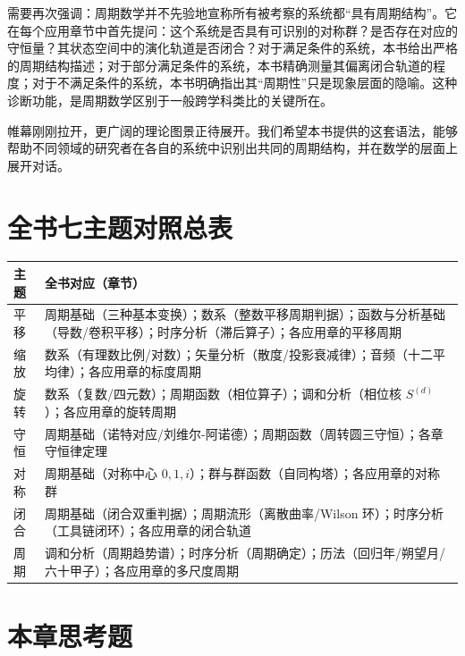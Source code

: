 需要再次强调：周期数学并不先验地宣称所有被考察的系统都“具有周期结构”。它在每个应用章节中首先提问：这个系统是否具有可识别的对称群？是否存在对应的守恒量？其状态空间中的演化轨道是否闭合？对于满足条件的系统，本书给出严格的周期结构描述；对于部分满足条件的系统，本书精确测量其偏离闭合轨道的程度；对于不满足条件的系统，本书明确指出其“周期性”只是现象层面的隐喻。这种诊断功能，是周期数学区别于一般跨学科类比的关键所在。

帷幕刚刚拉开，更广阔的理论图景正待展开。我们希望本书提供的这套语法，能够帮助不同领域的研究者在各自的系统中识别出共同的周期结构，并在数学的层面上展开对话。

\section*{全书七主题对照总表}

\begin{center}
\renewcommand{\arraystretch}{1.3}
\begin{tabular}{@{}p{2.2cm} p{10.5cm}@{}}
\toprule
主题 & 全书对应（章节） \\
\midrule
平移 & 周期基础（三种基本变换）；数系（整数平移周期判据）；函数与分析基础（导数/卷积平移）；时序分析（滞后算子）；各应用章的平移周期 \\
缩放 & 数系（有理数比例/对数）；矢量分析（散度/投影衰减律）；音频（十二平均律）；各应用章的标度周期 \\
旋转 & 数系（复数/四元数）；周期函数（相位算子）；调和分析（相位核 $S^{(d)}$）；各应用章的旋转周期 \\
守恒 & 周期基础（诺特对应/刘维尔-阿诺德）；周期函数（周转圆三守恒）；各章守恒律定理 \\
对称 & 周期基础（对称中心 $0,1,i$）；群与群函数（自同构塔）；各应用章的对称群 \\
闭合 & 周期基础（闭合双重判据）；周期流形（离散曲率/Wilson 环）；时序分析（工具链闭环）；各应用章的闭合轨道 \\
周期 & 调和分析（周期趋势谱）；时序分析（周期确定）；历法（回归年/朔望月/六十甲子）；各应用章的多尺度周期 \\
\bottomrule
\end{tabular}
\end{center}


\section*{本章思考题}

